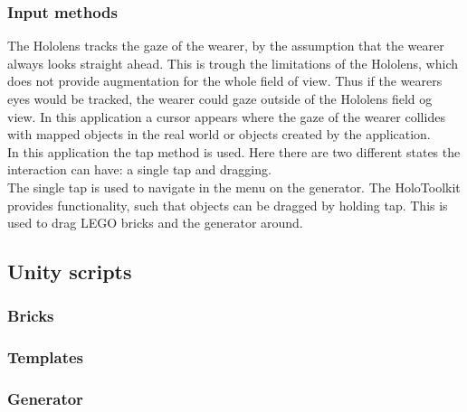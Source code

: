 \subsubsection{Input methods}
The Hololens tracks the gaze of the wearer, by the assumption that the wearer always looks straight ahead. This is trough the limitations of the Hololens, which does not provide augmentation for the whole field of view. Thus if the wearers eyes would be tracked, the wearer could gaze outside of the Hololens field og view. In this application a cursor appears where the gaze of the wearer collides with mapped objects in the real world or objects created by the application.\\ 
In this application the tap method is used. Here there are two different states the interaction can have: a single tap and dragging. \\
The single tap is used to navigate in the menu on the generator. The HoloToolkit provides functionality, such that objects can be dragged by holding tap. This is used to drag LEGO bricks and the generator around.

\subsection{Unity scripts}
\subsubsection{Bricks}
\subsubsection{Templates}
\subsubsection{Generator}